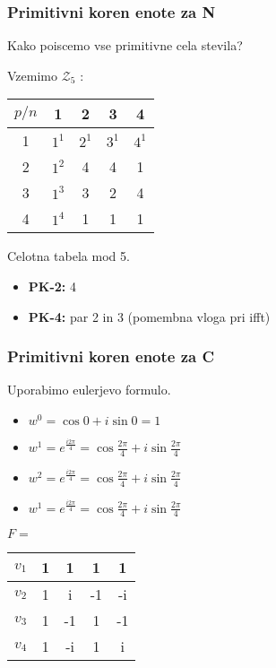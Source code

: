 \documentclass{article}
\begin{document}
\begin{multicols}{2}
	\subsubsection{Primitivni koren enote za N}
	Kako poiscemo vse primitivne cela stevila?

	Vzemimo  $\mathcal{Z}_5$ :
	\begin{center}
		\begin{tabular}{ |c|c|c|c|c| }
			\hline
			$p / n$ & 1     & 2     & 3     & 4     \\
			\hline
			1       & $1^1$ & $2^1$ & $3^1$ & $4^1$ \\
			\hline
			2       & $1^2$ & 4     & 4     & 1     \\
			\hline
			3       & $1^3$ & 3     & 2     & 4     \\
			\hline
			4       & $1^4$ & 1     & 1     & 1     \\
			\hline
		\end{tabular}

		Celotna tabela mod 5.
	\end{center}

	\begin{itemize}
		\item \textbf{PK-2:} 4
		\item \textbf{PK-4:} par 2 in 3  (pomembna vloga pri ifft)
	\end{itemize}

	\subsubsection{Primitivni koren enote za C}
	Uporabimo eulerjevo formulo.

	\begin{itemize}
		\item $w^0 = \cos0 + i\sin0 = 1$
		\item $w^1 = e^{\frac{i 2 \pi} {4}} = \cos \frac{2\pi}{4} + i\sin\frac{2\pi}{4}$
		\item $w^2 = e^{\frac{i 2 \pi} {4}} = \cos \frac{2\pi}{4} + i\sin\frac{2\pi}{4}$
		\item $w^1 = e^{\frac{i 2 \pi} {4}} = \cos \frac{2\pi}{4} + i\sin\frac{2\pi}{4}$
	\end{itemize}

	\begin{center}
		$F =$
		\begin{tabular}{ |c|c|c|c|c| }
			\hline
			$v_1$ & 1 & 1  & 1  & 1  \\
			\hline
			$v_2$ & 1 & i  & -1 & -i \\
			\hline
			$v_3$ & 1 & -1 & 1  & -1 \\
			\hline
			$v_4$ & 1 & -i & 1  & i  \\
			\hline
		\end{tabular}
	\end{center}


\end{multicols}
\end{document}
